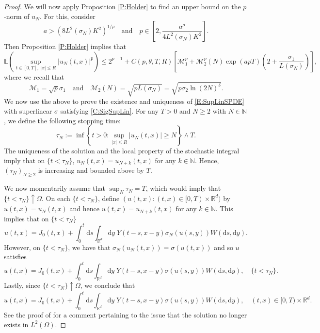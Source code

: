 \documentclass[12pt]{report}
\theoremstyle{plain}
\theoremstyle{definition}
\numberwithin{equation}{section}
\newcommand{\R}{\mathbb{R}}
\newcommand{\ud}{\ensuremath{ \mathrm{d} }}
\begin{document}
\begin{proof}
	We will now apply Proposition \ref{P:Holder} to find an upper bound on the $p$-norm of $u_N$. For this, consider 
	\[
	a > \left( 8 L^2(\sigma_N) K^2 \right)^{1/\rho} \quad \text{and} \quad p \in \left[ 2, \frac{a^{ \rho}}{4L^2(\sigma_N)K^2} \right].
	\] 
	Then Proposition \ref{P:Holder} implies that 
	\begin{equation}
	\label{E:u_NMomBdd}
	\mathbb{E}\left(\sup_{t\in[0,T],\; |x| \le  R} |u_N(t,x)|^p\right) \le 2^{p-1} + C(p, \theta, T,R)\left[\mathcal{M}_1^p + \mathcal{M}_2^p(N) \exp(apT)\left(2+ \frac{\sigma_1}{L(\sigma_N)}\right)\right],
	\end{equation}
	where we recall that 
	\begin{equation}
	\label{D:M1&2forSig_N}
	\mathcal{M}_1 = \sqrt{p}\sigma_1 \quad \text{and} \quad \mathcal{M}_2(N) = \sqrt{pL(\sigma_N)} = \sqrt{p\sigma_2\ln(2N)^\delta}.
	\end{equation}
	We now use the above to prove the existence and uniqueness of \eqref{E:SupLinSPDE} with superlinear $\sigma$ satisfying \eqref{C:SigSupLin}. For any $T>0$ and $N \ge 2$ with $N\in \mathbb{N}$, we define the following stopping time:
	\begin{equation}
	\tau_N := \inf \left\{ t>0 : \sup_{|x| \le R} |u_N(t,x)| \ge N \right\} \wedge T.
	\end{equation}
	The uniqueness of the solution and the local property of the stochastic integral imply that on $\{t < \tau_N\}$, $u_N(t,x) = u_{N+k}(t,x)$ for any $k \in \mathbb{N}$. Hence, $(\tau_N)_{N \ge 2}$ is increasing and bounded above by $T$. 
	
	We now momentarily assume that $\sup_N \tau_N = T$, which would imply that $\{t < \tau_N \} \uparrow \Omega$. On each $\{ t < \tau_N \}$, define $(u(t,x) : (t,x) \in [0,T) \times \R^d)$ by $u(t,x) = u_N(t,x)$ and hence $u(t,x) = u_{N+k}(t,x)$ for any $k\in \mathbb{N}$. This implies that on $\{ t < \tau_N \}$ 
	\[
	u(t,x) = J_0(t,x) + \int_0^t \ud s \int_{\R^d} \ud y \; Y(t-s,x-y) \sigma_N(u(s,y)) W(\ud s, \ud y).
	\]
	However, on $\{ t < \tau_N \}$, we have that $\sigma_N(u_N(t,x)) = \sigma(u(t,x))$ and so $u$ satisfies
	\[
	u(t,x) = J_0(t,x) + \int_0^t \ud s \int_{\R^d} \ud y \; Y(t-s,x-y) \sigma(u(s,y)) W(\ud s, \ud y), \quad \{ t < \tau_N \}.
	\]
	Lastly, since $\{ t < \tau_N \} \uparrow \Omega$, we conclude that 
	\begin{equation}
	\label{E:SupLinMildSol}
	u(t,x) = J_0(t,x) + \int_0^t \ud s \int_{\R^d} \ud y \; Y(t-s,x-y) \sigma(u(s,y)) W(\ud s, \ud y), \quad (t,x) \in [0,T) \times \R^d.
	\end{equation}
	See the proof of \cite[Theorem 3.5]{millet.sanz-sole:21:global} for a comment pertaining to the issue that the solution no longer exists in $L^2(\Omega)$.  
	

\end{proof}
\end{document}
